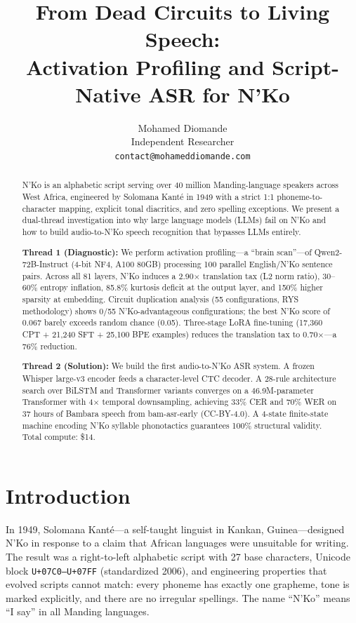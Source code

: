 \documentclass[11pt]{article}
\title{From Dead Circuits to Living Speech:\\Activation Profiling and Script-Native ASR for N'Ko}
\author{
  Mohamed Diomande \\
  Independent Researcher \\
  \texttt{contact@mohameddiomande.com}
}
\begin{document}
\maketitle

\begin{abstract}
N'Ko is an alphabetic script serving over 40 million Manding-language speakers across West Africa, engineered by Solomana Kant\'{e} in 1949 with a strict 1:1 phoneme-to-character mapping, explicit tonal diacritics, and zero spelling exceptions.
We present a dual-thread investigation into why large language models (LLMs) fail on N'Ko and how to build audio-to-N'Ko speech recognition that bypasses LLMs entirely.

\textbf{Thread 1 (Diagnostic):} We perform activation profiling---a ``brain scan''---of Qwen2-72B-Instruct (4-bit NF4, A100 80GB) processing 100 parallel English/N'Ko sentence pairs.
Across all 81 layers, N'Ko induces a 2.90$\times$ translation tax (L2 norm ratio), 30--60\% entropy inflation, 85.8\% kurtosis deficit at the output layer, and 150\% higher sparsity at embedding.
Circuit duplication analysis (55 configurations, RYS methodology) shows 0/55 N'Ko-advantageous configurations; the best N'Ko score of 0.067 barely exceeds random chance (0.05).
Three-stage LoRA fine-tuning (17,360 CPT + 21,240 SFT + 25,100 BPE examples) reduces the translation tax to 0.70$\times$---a 76\% reduction.

\textbf{Thread 2 (Solution):} We build the first audio-to-N'Ko ASR system.
A frozen Whisper large-v3 encoder feeds a character-level CTC decoder.
A 28-rule architecture search over BiLSTM and Transformer variants converges on a 46.9M-parameter Transformer with 4$\times$ temporal downsampling, achieving 33\% CER and 70\% WER on 37 hours of Bambara speech from bam-asr-early (CC-BY-4.0).
A 4-state finite-state machine encoding N'Ko syllable phonotactics guarantees 100\% structural validity.
Total compute: \$14.
\end{abstract}

\section{Introduction}

In 1949, Solomana Kant\'{e}---a self-taught linguist in Kankan, Guinea---designed N'Ko in response to a claim that African languages were unsuitable for writing.
The result was a right-to-left alphabetic script with 27 base characters, Unicode block \texttt{U+07C0--U+07FF} (standardized 2006), and engineering properties that evolved scripts cannot match: every phoneme has exactly one grapheme, tone is marked explicitly, and there are no irregular spellings.
The name ``N'Ko'' means ``I say'' in all Manding languages.
\end{document}
